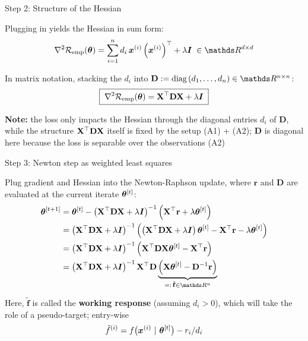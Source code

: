 \documentclass[11pt,compress,t,notes=noshow, xcolor=table]{beamer}
\begin{document}
\begin{framei}[fs=small]{Step 2: Structure of the Hessian}
\item Plugging in yields the Hessian in sum form:
$$
\nabla^2 \risket = \sumin d_i\, \xi \left(\xi\right)^\top + \lambda \id \; \in \R^{d \times d}
$$
\item In matrix notation, stacking the $d_i$ into $\mathbf{D} := \text{diag}\left(d_1, \dots, d_n\right) \in \R^{n \times n}$:
$$
\boxed{\;\nabla^2 \mathcal{R}_{\text{emp}}(\bm{\theta}) = \mathbf{X}^\top \mathbf{D} \mathbf{X} + \lambda \bm{I}\;}
$$
\vfill
\item \textbf{Note:} the loss only impacts the Hessian through the diagonal entries $d_i$ of $\mathbf{D}$, while the structure $\mathbf{X}^\top \mathbf{D} \mathbf{X}$ itself is fixed by the setup (A1) + (A2); $\mathbf{D}$ is diagonal here because the loss is separable over the observations (A2)
\end{framei}


\begin{framei}[fs=small]{Step 3: Newton step as weighted least squares}
\item Plug gradient and Hessian into the Newton-Raphson update, where $\mathbf{r}$ and $\mathbf{D}$ are evaluated at the current iterate $\bm{\theta}^{[t]}$:
$$
\begin{aligned}
\thetatn &= \thetat - \left(\Xmat^\top \mathbf{D} \Xmat + \lambda \id\right)^{-1} \left(\Xmat^\top \mathbf{r} + \lambda \thetat\right) \\
&= \left(\Xmat^\top \mathbf{D} \Xmat + \lambda \id\right)^{-1} \left(\left(\Xmat^\top \mathbf{D} \Xmat + \lambda \id\right) \thetat - \Xmat^\top \mathbf{r} - \lambda \thetat\right) \\
&= \left(\Xmat^\top \mathbf{D} \Xmat + \lambda \id\right)^{-1} \left(\Xmat^\top \mathbf{D} \Xmat \thetat - \Xmat^\top \mathbf{r}\right) \\
&= \left(\Xmat^\top \mathbf{D} \Xmat + \lambda \id\right)^{-1} \Xmat^\top \mathbf{D} \underbrace{\left(\Xmat \thetat - \mathbf{D}^{-1} \mathbf{r}\right)}_{=:\, \tilde{\mathbf{f}} \in \R^n}
\end{aligned}
$$
\item Here, $\tilde{\mathbf{f}}$ is called the \textbf{working response} (assuming $d_i > 0$), which will take the role of a pseudo-target; entry-wise
$$
\tilde{f}^{(i)} = f\big(\bm{x}^{(i)} ~|~ \bm{\theta}^{[t]}\big) - r_i / d_i
$$
\end{framei}
\end{document}
